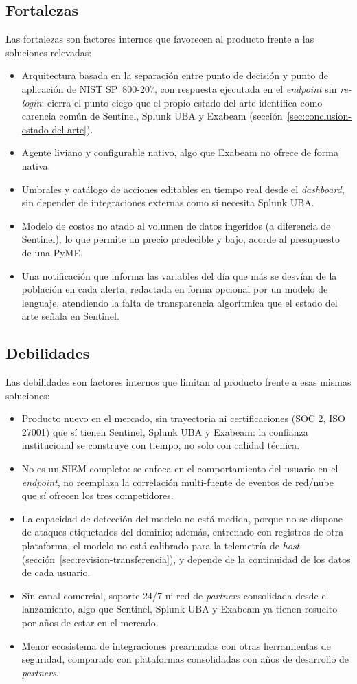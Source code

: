 \subsection{Fortalezas}
Las fortalezas son factores internos que favorecen al producto frente a las soluciones relevadas:
\begin{itemize}
	\item Arquitectura basada en la separación entre punto de decisión y punto de aplicación de NIST SP~800-207, con respuesta ejecutada en el \emph{endpoint} sin \emph{re-login}: cierra el punto ciego que el propio estado del arte identifica como carencia común de Sentinel, Splunk UBA y Exabeam (sección~\ref{sec:conclusion-estado-del-arte}).
	\item Agente liviano y configurable nativo, algo que Exabeam no ofrece de forma nativa.
	\item Umbrales y catálogo de acciones editables en tiempo real desde el \emph{dashboard}, sin depender de integraciones externas como sí necesita Splunk UBA.
	\item Modelo de costos no atado al volumen de datos ingeridos (a diferencia de Sentinel), lo que permite un precio predecible y bajo, acorde al presupuesto de una PyME.
	\item Una notificación que informa las variables del día que más se desvían de la población en cada alerta, redactada en forma opcional por un modelo de lenguaje, atendiendo la falta de transparencia algorítmica que el estado del arte señala en Sentinel.
\end{itemize}

\subsection{Debilidades}
Las debilidades son factores internos que limitan al producto frente a esas mismas soluciones:
\begin{itemize}
	\item Producto nuevo en el mercado, sin trayectoria ni certificaciones (SOC 2, ISO 27001) que sí tienen Sentinel, Splunk UBA y Exabeam: la confianza institucional se construye con tiempo, no solo con calidad técnica.
	\item No es un SIEM completo: se enfoca en el comportamiento del usuario en el \emph{endpoint}, no reemplaza la correlación multi-fuente de eventos de red/nube que sí ofrecen los tres competidores.
	\item La capacidad de detección del modelo no está medida, porque no se dispone de ataques etiquetados del dominio; además, entrenado con registros de otra plataforma, el modelo no está calibrado para la telemetría de \emph{host} (sección~\ref{sec:revision-transferencia}), y depende de la continuidad de los datos de cada usuario.
	\item Sin canal comercial, soporte 24/7 ni red de \emph{partners} consolidada desde el lanzamiento, algo que Sentinel, Splunk UBA y Exabeam ya tienen resuelto por años de estar en el mercado.
	\item Menor ecosistema de integraciones prearmadas con otras herramientas de seguridad, comparado con plataformas consolidadas con años de desarrollo de \emph{partners}.
\end{itemize}

